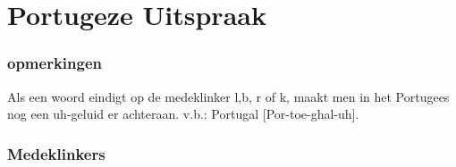 \section{Portugeze Uitspraak}
\subsubsection*{opmerkingen}
\vspace{-12pt}
\begin{compactenum}
\item Als een woord eindigt op de medeklinker l,b, r of k, maakt men in het Portugees nog een uh-geluid er achteraan. v.b.: Portugal [Por-toe-ghal-uh].
\end{compactenum}

\subsubsection*{Medeklinkers}
